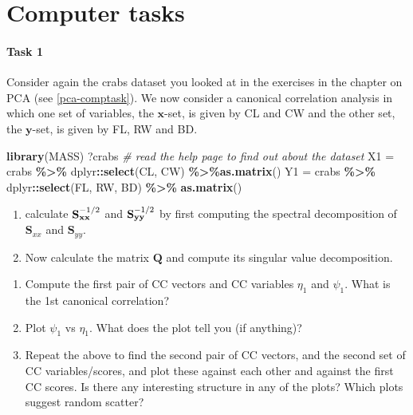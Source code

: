 \documentclass[
]{book}
\newenvironment{Shaded}{\begin{snugshade}}{\end{snugshade}}
\newcommand{\CommentTok}[1]{\textcolor[rgb]{0.56,0.35,0.01}{\textit{#1}}}
\newcommand{\FunctionTok}[1]{\textcolor[rgb]{0.13,0.29,0.53}{\textbf{#1}}}
\newcommand{\NormalTok}[1]{#1}
\newcommand{\OtherTok}[1]{\textcolor[rgb]{0.56,0.35,0.01}{#1}}
\newcommand{\SpecialCharTok}[1]{\textcolor[rgb]{0.81,0.36,0.00}{\textbf{#1}}}
\theoremstyle{definition}
\theoremstyle{definition}
\theoremstyle{definition}
\theoremstyle{definition}
\theoremstyle{remark}
\begin{document}
\hypertarget{computer-tasks-1}{%
\section{Computer tasks}\label{computer-tasks-1}}

\hypertarget{task-1}{%
\paragraph*{Task 1}\label{task-1}}

Consider again the crabs dataset you looked at in the exercises in the chapter on PCA (see \ref{pca-comptask}).
We now consider a canonical correlation analysis in which one set of variables, the \(\mathbf x\)-set, is given by CL and CW and the
other set, the \(\mathbf y\)-set, is given by FL, RW and BD.

\begin{Shaded}
\begin{Highlighting}[]
\FunctionTok{library}\NormalTok{(MASS)}
\NormalTok{?crabs           }\CommentTok{\# read the help page to find out about the dataset}
\NormalTok{X1 }\OtherTok{=}\NormalTok{ crabs }\SpecialCharTok{\%\textgreater{}\%}\NormalTok{ dplyr}\SpecialCharTok{::}\FunctionTok{select}\NormalTok{(CL, CW)  }\SpecialCharTok{\%\textgreater{}\%}\FunctionTok{as.matrix}\NormalTok{()  }
\NormalTok{Y1 }\OtherTok{=}\NormalTok{ crabs }\SpecialCharTok{\%\textgreater{}\%}\NormalTok{ dplyr}\SpecialCharTok{::}\FunctionTok{select}\NormalTok{(FL, RW, BD) }\SpecialCharTok{\%\textgreater{}\%} \FunctionTok{as.matrix}\NormalTok{()            }
\end{Highlighting}
\end{Shaded}

\begin{enumerate}
\def\labelenumi{\roman{enumi}.}
\item
  calculate \({\bf S}_{\bf x x}^{-1/2}\) and \({\bf S}_{\bf yy}^{-1/2}\) by first computing the spectral decomposition of \(\mathbf S_{xx}\) and \(\mathbf S_{yy}\).
\item
  Now calculate the matrix \(\mathbf Q\) and compute its singular value decomposition.
\end{enumerate}

\begin{enumerate}
\def\labelenumi{\roman{enumi}.}
\setcounter{enumi}{2}
\item
  Compute the first pair of CC vectors and CC variables \(\eta_1\) and \(\psi_1\). What is the 1st canonical correlation?
\item
  Plot \(\psi_1\) vs \(\eta_1\). What does the plot tell you (if anything)?
\item
  Repeat the above to find the second pair of CC vectors, and the second set of CC variables/scores, and plot these against each other and against the first CC scores. Is there any interesting structure in any of the plots? Which plots suggest random scatter?
\end{enumerate}
\end{document}
